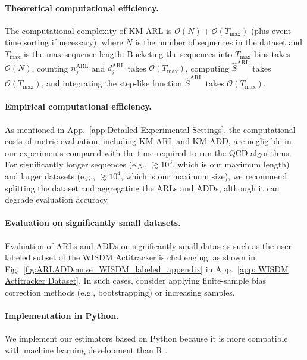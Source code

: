 \documentclass{article}
\theoremstyle{plain}
\theoremstyle{definition}
\theoremstyle{remark}
\begin{document}
\paragraph{Theoretical computational efficiency.}
The computational complexity of KM-ARL is $\mathcal{O}(N) + \mathcal{O}(T_\mathrm{max})$ (plus event time sorting if necessary), where $N$ is the number of sequences in the dataset and $T_\mathrm{max}$ is the max sequence length. Bucketing the sequences into $T_\mathrm{max}$ bins takes $\mathcal{O}(N)$, counting $n_j^\mathrm{ARL}$ and $d_j^\mathrm{ARL}$ takes $\mathcal{O}(T_\mathrm{max})$, computing $\hat{S}^\mathrm{ARL}$ takes $\mathcal{O}(T_\mathrm{max})$, and integrating the step-like function $\hat{S}^\mathrm{ARL}$ takes $\mathcal{O}(T_\mathrm{max})$. 

\paragraph{Empirical computational efficiency.}
As mentioned in App.~\ref{app:Detailed Experimental Settings}, the computational costs of metric evaluation, including KM-ARL and KM-ADD, are negligible in our experiments compared with the time required to run the QCD algorithms.
For significantly longer sequences (e.g., $\gtrsim 10^3$, which is our maximum length) and larger datasets (e.g., $\gtrsim 10^4$, which is our maximum size), we recommend splitting the dataset and aggregating the ARLs and ADDs, although it can degrade evaluation accuracy.

\paragraph{Evaluation on significantly small datasets.}
Evaluation of ARLs and ADDs on significantly small datasets such as the user-labeled subset of the WISDM Actitracker is challenging, as shown in Fig.~\ref{fig:ARLADDcurve_WISDM_labeled_appendix} in App.~\ref{app: WISDM Actitracker Dataset}.
In such cases, consider applying finite-sample bias correction methods (e.g., bootstrapping) or increasing samples. 

\paragraph{Implementation in Python.}
We implement our estimators based on Python \citep{Python3} because it is more compatible with machine learning development than R \citep{R_statistical_software}. 

\end{document}
